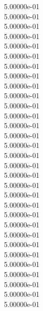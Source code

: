 5.00000e-01\\
5.00000e-01\\
5.00000e-01\\
5.00000e-01\\
5.00000e-01\\
5.00000e-01\\
5.00000e-01\\
5.00000e-01\\
5.00000e-01\\
5.00000e-01\\
5.00000e-01\\
5.00000e-01\\
5.00000e-01\\
5.00000e-01\\
5.00000e-01\\
5.00000e-01\\
5.00000e-01\\
5.00000e-01\\
5.00000e-01\\
5.00000e-01\\
5.00000e-01\\
5.00000e-01\\
5.00000e-01\\
5.00000e-01\\
5.00000e-01\\
5.00000e-01\\
5.00000e-01\\
5.00000e-01\\
5.00000e-01\\
5.00000e-01\\
5.00000e-01\\
